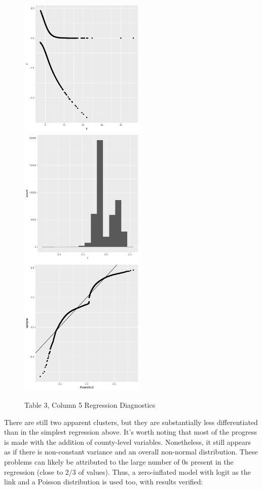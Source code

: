 \documentclass{article}
\begin{document}
\begin{figure}[!hbtp]
\centering
\caption{Table 3, Column 5 Regression Diagnostics}
\includegraphics[width=6cm]{../explore/Output/diagnostics/edu_OOSLogit5Plot.pdf}
\includegraphics[width=6cm]{../explore/Output/diagnostics/edu_OOSLogit5Hist.pdf}
\includegraphics[width=6cm]{../explore/Output/diagnostics/edu_OOSLogit5QQ.pdf}
\end{figure} 

There are still two apparent clusters, but they are substantially less differentiated than in the simplest regression above. It's worth noting that most of the progress is made with the addition of county-level variables. Nonetheless, it still appears as if there is non-constant variance and an overall non-normal distribution. These problems can likely be attributed to the large number of 0s present in the regression (close to $2/3$ of values). Thus, a zero-inflated model with logit as the link and a Poisson distribution is used too, with results verified:
\end{document}
